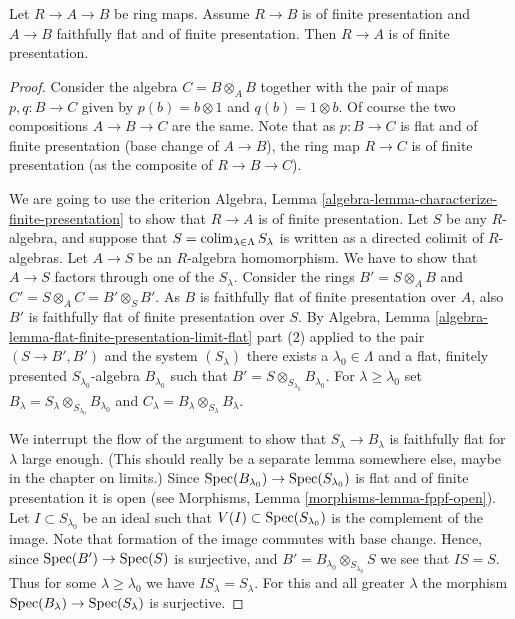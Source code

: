 \begin{lemma}
\label{lemma-flat-finitely-presented-permanence-algebra}
Let $R \to A \to B$ be ring maps.
Assume $R \to B$ is of finite presentation and
$A \to B$ faithfully flat and of finite presentation.
Then $R \to A$ is of finite presentation.
\end{lemma}

\begin{proof}
Consider the algebra $C = B \otimes_A B$ together with the
pair of maps $p, q : B \to C$ given by $p(b) = b \otimes 1$
and $q(b) = 1 \otimes b$. Of course the two compositions
$A \to B \to C$ are the same. Note that as
$p : B \to C$ is flat and of finite presentation (base change of
$A \to B$), the ring map $R \to C$ is of finite presentation
(as the composite of $R \to B \to C$).

\medskip\noindent
We are going to use the criterion
Algebra, Lemma \ref{algebra-lemma-characterize-finite-presentation}
to show that $R \to A$ is of finite presentation.
Let $S$ be any $R$-algebra, and suppose that
$S = \mathop{\mathrm{colim}}\nolimits_{\lambda \in \Lambda} S_\lambda$ is written
as a directed colimit of $R$-algebras.
Let $A \to S$ be an $R$-algebra homomorphism. We have to
show that $A \to S$ factors through one of the $S_\lambda$.
Consider the rings $B' = S \otimes_A B$ and
$C' = S \otimes_A C = B' \otimes_S B'$.
As $B$ is faithfully flat of finite presentation over $A$, also $B'$
is faithfully flat of finite presentation over $S$.
By Algebra, Lemma \ref{algebra-lemma-flat-finite-presentation-limit-flat}
part (2) applied to the pair $(S \to B', B')$ and the system $(S_\lambda)$
there exists a $\lambda_0 \in \Lambda$
and a flat, finitely presented $S_{\lambda_0}$-algebra
$B_{\lambda_0}$ such that $B' = S \otimes_{S_{\lambda_0}} B_{\lambda_0}$.
For $\lambda \geq \lambda_0$ set
$B_\lambda = S_\lambda \otimes_{S_{\lambda_0}} B_{\lambda_0}$ and
$C_\lambda = B_\lambda \otimes_{S_\lambda} B_\lambda$.

\medskip\noindent
We interrupt the flow of the argument to show that $S_\lambda \to B_\lambda$
is faithfully flat for $\lambda$ large enough. (This should really
be a separate lemma somewhere else, maybe in the chapter on limits.)
Since $\mathop{\mathrm{Spec}}(B_{\lambda_0}) \to \mathop{\mathrm{Spec}}(S_{\lambda_0})$ is
flat and of finite presentation it is open (see Morphisms,
Lemma \ref{morphisms-lemma-fppf-open}).
Let $I \subset S_{\lambda_0}$ be an ideal such that
$V(I) \subset \mathop{\mathrm{Spec}}(S_{\lambda_0})$ is the complement
of the image. Note that formation of the image commutes
with base change. Hence, since $\mathop{\mathrm{Spec}}(B') \to \mathop{\mathrm{Spec}}(S)$
is surjective, and $B' = B_{\lambda_0} \otimes_{S_{\lambda_0}} S$
we see that $IS = S$. Thus for some $\lambda \geq \lambda_0$ we
have $IS_{\lambda} = S_\lambda$. For this and all greater
$\lambda$ the morphism
$\mathop{\mathrm{Spec}}(B_\lambda) \to \mathop{\mathrm{Spec}}(S_\lambda)$ is surjective.


\end{proof}
